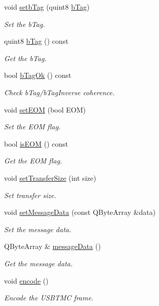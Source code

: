 \begin{DoxyCompactItemize}
void \hyperlink{classmdt_frame_usb_tmc_aff7b19ad83013402dd115089d31b8642}{setb\-Tag} (quint8 \hyperlink{classmdt_frame_usb_tmc_a471c97b844331376ed1801cdb50f5cc6}{b\-Tag})
\begin{DoxyCompactList}\small\item\em Set the b\-Tag. \end{DoxyCompactList}\item 
quint8 \hyperlink{classmdt_frame_usb_tmc_a471c97b844331376ed1801cdb50f5cc6}{b\-Tag} () const 
\begin{DoxyCompactList}\small\item\em Get the b\-Tag. \end{DoxyCompactList}\item 
bool \hyperlink{classmdt_frame_usb_tmc_ae02dc125ea0e1b2fb0ae12ef43581703}{b\-Tag\-Ok} () const 
\begin{DoxyCompactList}\small\item\em Check b\-Tag/b\-Tag\-Inverse coherence. \end{DoxyCompactList}\item 
void \hyperlink{classmdt_frame_usb_tmc_ab6e494c35eba34905987a75101fc48fe}{set\-E\-O\-M} (bool E\-O\-M)
\begin{DoxyCompactList}\small\item\em Set the E\-O\-M flag. \end{DoxyCompactList}\item 
bool \hyperlink{classmdt_frame_usb_tmc_a82e93db0fc709b951c0c1f7b70692b5c}{is\-E\-O\-M} () const 
\begin{DoxyCompactList}\small\item\em Get the E\-O\-M flag. \end{DoxyCompactList}\item 
void \hyperlink{classmdt_frame_usb_tmc_a7ad2f8426ebeceaa6f84925d9a96b5c0}{set\-Transfer\-Size} (int size)
\begin{DoxyCompactList}\small\item\em Set transfer size. \end{DoxyCompactList}\item 
void \hyperlink{classmdt_frame_usb_tmc_a7fa61faeaa5d1f5820794c5943b26e26}{set\-Message\-Data} (const Q\-Byte\-Array \&data)
\begin{DoxyCompactList}\small\item\em Set the message data. \end{DoxyCompactList}\item 
Q\-Byte\-Array \& \hyperlink{classmdt_frame_usb_tmc_a03d9a1c16099ba7ea1e3a2b0c4e1493e}{message\-Data} ()
\begin{DoxyCompactList}\small\item\em Get the message data. \end{DoxyCompactList}\item 
void \hyperlink{classmdt_frame_usb_tmc_a9406dddfdd70f5dac729b2dbd728de77}{encode} ()
\begin{DoxyCompactList}\small\item\em Encode the U\-S\-B\-T\-M\-C frame. \end{DoxyCompactList}\end{DoxyCompactItemize}
